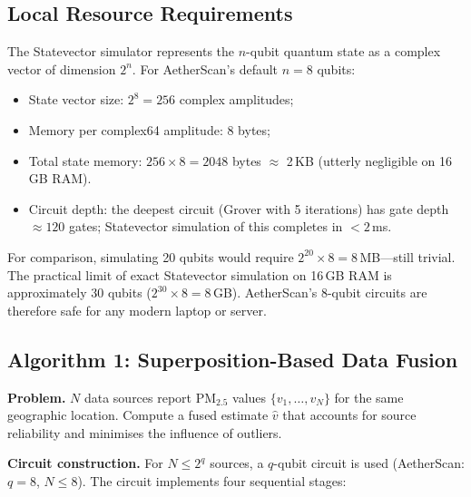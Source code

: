 \documentclass[12pt,a4paper]{article}
\begin{document}
\subsection{Local Resource Requirements}
\label{sec:quantum:resources}

The Statevector simulator represents the $n$-qubit quantum state as a complex
vector of dimension $2^n$. For AetherScan's default $n = 8$ qubits:
\begin{itemize}[leftmargin=*]
\item State vector size: $2^8 = 256$ complex amplitudes;
\item Memory per complex64 amplitude: 8 bytes;
\item Total state memory: $256 \times 8 = 2048$ bytes $\approx$ 2\,KB
      (utterly negligible on 16\,GB RAM).
\item Circuit depth: the deepest circuit (Grover with 5 iterations) has
      gate depth $\approx 120$ gates; Statevector simulation of this completes
      in $< 2$\,ms.
\end{itemize}

For comparison, simulating 20 qubits would require
$2^{20} \times 8 = 8$\,MB---still trivial. The practical limit of exact
Statevector simulation on 16\,GB RAM is approximately 30 qubits
($2^{30} \times 8 = 8$\,GB). AetherScan's 8-qubit circuits are therefore
safe for any modern laptop or server.

\subsection{Algorithm 1: Superposition-Based Data Fusion}
\label{sec:quantum:superpos}

\noindent\textbf{Problem.} $N$ data sources report $\text{PM}_{2.5}$
values $\{v_1, \ldots, v_N\}$ for the same geographic location. Compute a
fused estimate $\hat{v}$ that accounts for source reliability and minimises
the influence of outliers.

\noindent\textbf{Circuit construction.}
For $N \leq 2^q$ sources, a $q$-qubit circuit is used (AetherScan: $q = 8$,
$N \leq 8$). The circuit implements four sequential stages:
\end{document}
